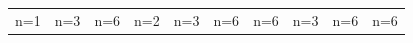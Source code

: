\documentclass[letterpaper]{article} %
\begin{document}
\begin{figure}[!htbp]
\centering
\footnotesize
\begin{tabular}{cccccccccc}
\multicolumn{1}{c}{n=1} \hspace{-11pt} &  
\multicolumn{1}{c}{n=3} \hspace{-11pt} & 
\multicolumn{1}{c}{n=6} \hspace{-11pt} & 
\multicolumn{1}{c}{n=2} \hspace{-11pt} & 
\multicolumn{1}{c}{n=3} \hspace{-11pt} & 
\multicolumn{1}{c}{n=6} \hspace{-11pt} & 
\multicolumn{1}{c}{n=6} \hspace{-11pt} &  
\multicolumn{1}{c}{n=3} \hspace{-11pt} & 
\multicolumn{1}{c}{n=6} \hspace{-11pt} & 
\multicolumn{1}{c}{n=6} \\ 


\end{tabular}
\end{figure}
\end{document}
